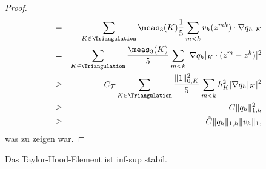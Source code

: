 \begin{proof}
\begin{eqnarray*}
        &=& - \sum_{K\in \Triangulation} \meas_3(K) \frac{1}{5} \sum_{m < k}
            v_h(z^{mk}) \cdot \nabla q_h|_K \\
        &=& \sum_{K\in \Triangulation} \frac{\meas_3(K)}{5} \sum_{m < k}
            |\nabla q_h|_K \cdot (z^m - z^k)|^2 \\
        &\ge& C_\mathcal{T} \sum_{K\in \Triangulation} \frac{\|1\|_{0,K}^2}{5}
              \sum_{m < k} h_K^2 |\nabla q_h|_K|^2 \\
        &\ge& C \|q_h\|_{1,h}^2 \\
        &\ge& \tilde C \|q_h\|_{1,h} \|v_h\|_1,
    \end{eqnarray*}
    was zu zeigen war.
\end{proof}


\begin{Satz}
    \label{satz:5.20}
    Das Taylor-Hood-Element ist inf-sup stabil.
\end{Satz}


